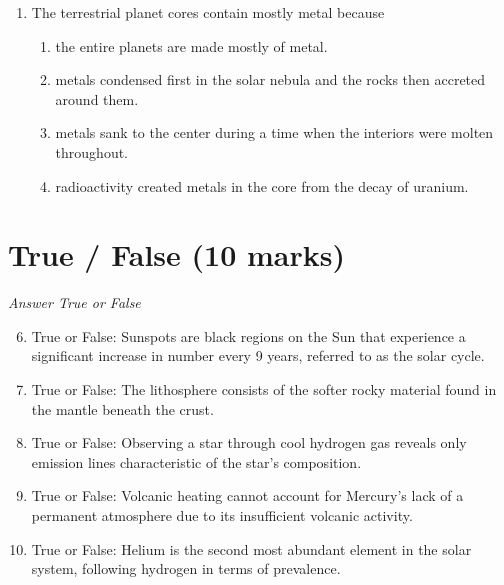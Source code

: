 \documentclass[12pt]{article}
\begin{document}
\begin{enumerate}[label=\arabic*.]
\begin{enumerate}[label=(\alph*)]
    \item the presence of belts zones and storms
    \item an equatorial wind speed of more than 900 miles per hour
    \item significant "shear" between bands of circulation at different latitudes
\end{enumerate}
\item The terrestrial planet cores contain mostly metal because
\begin{enumerate}[label=(\alph*)]
    \item the entire planets are made mostly of metal.
    \item metals condensed first in the solar nebula and the rocks then accreted around them.
    \item metals sank to the center during a time when the interiors were molten throughout.
    \item radioactivity created metals in the core from the decay of uranium.
\end{enumerate}
\end{enumerate}

\section*{True / False (10 marks)}
\textit{Answer True or False}
\begin{enumerate}[label=\arabic*.]
\setcounter{enumi}{5}
\item True or False: Sunspots are black regions on the Sun that experience a significant increase in number every 9 years, referred to as the solar cycle.
\item True or False: The lithosphere consists of the softer rocky material found in the mantle beneath the crust.
\item True or False: Observing a star through cool hydrogen gas reveals only emission lines characteristic of the star's composition.
\item True or False: Volcanic heating cannot account for Mercury's lack of a permanent atmosphere due to its insufficient volcanic activity.
\item True or False: Helium is the second most abundant element in the solar system, following hydrogen in terms of prevalence.
\end{enumerate}
\end{document}
